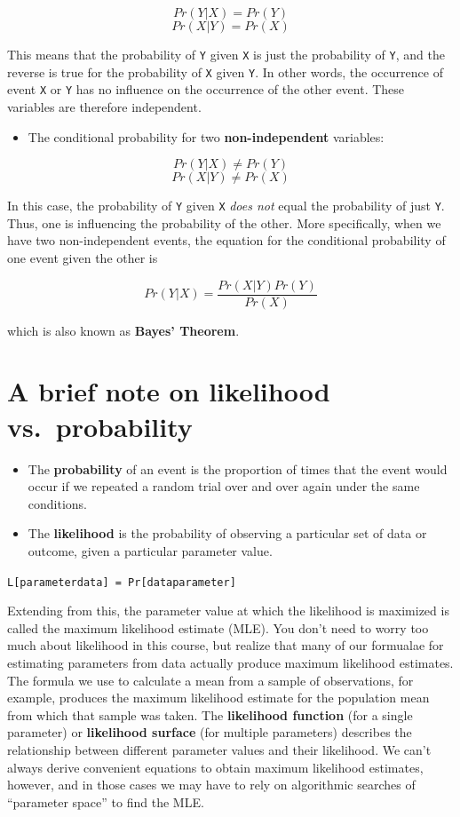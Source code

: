 \documentclass[]{book}
\providecommand{\tightlist}{%
  \setlength{\itemsep}{0pt}\setlength{\parskip}{0pt}}
\begin{document}
\[Pr(Y|X) = Pr(Y)\]
\[Pr(X|Y) = Pr(X)\]

This means that the probability of \texttt{Y} given \texttt{X} is just the probability of \texttt{Y}, and the reverse is true for the probability of \texttt{X} given \texttt{Y}. In other words, the occurrence of event \texttt{X} or \texttt{Y} has no influence on the occurrence of the other event. These variables are therefore independent.

\begin{itemize}
\tightlist
\item
  The conditional probability for two \textbf{non-independent} variables:
\end{itemize}

\[Pr(Y|X) \neq Pr(Y)\]
\[Pr(X|Y) \neq Pr(X)\]

In this case, the probability of \texttt{Y} given \texttt{X} \emph{does not} equal the probability of just \texttt{Y}. Thus, one is influencing the probability of the other. More specifically, when we have two non-independent events, the equation for the conditional probability of one event given the other is

\[Pr(Y|X) = \frac{Pr(X|Y)Pr(Y)}{Pr(X)}\]

which is also known as \textbf{Bayes' Theorem}.

\hypertarget{a-brief-note-on-likelihood-vs.probability}{%
\section{A brief note on likelihood vs.~probability}\label{a-brief-note-on-likelihood-vs.probability}}

\begin{itemize}
\item
  The \textbf{probability} of an event is the proportion of times that the event would occur if we repeated a random trial over and over again under the same conditions.
\item
  The \textbf{likelihood} is the probability of observing a particular set of data or outcome, given a particular parameter value.
\end{itemize}

\texttt{L{[}parameter\textbar{}data{]}\ =\ Pr{[}data\textbar{}parameter{]}}

Extending from this, the parameter value at which the likelihood is maximized is called the maximum likelihood estimate (MLE). You don't need to worry too much about likelihood in this course, but realize that many of our formualae for estimating parameters from data actually produce maximum likelihood estimates. The formula we use to calculate a mean from a sample of observations, for example, produces the maximum likelihood estimate for the population mean from which that sample was taken. The \textbf{likelihood function} (for a single parameter) or \textbf{likelihood surface} (for multiple parameters) describes the relationship between different parameter values and their likelihood. We can't always derive convenient equations to obtain maximum likelihood estimates, however, and in those cases we may have to rely on algorithmic searches of ``parameter space'' to find the MLE.
\end{document}
